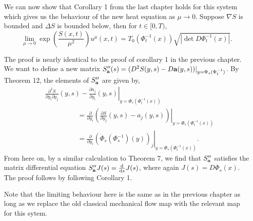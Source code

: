 \documentclass[a4paper,12pt,draft]{report}
\theoremstyle{remark}
\theoremstyle{definition}
\begin{document}
We can now show that Corollary 1 from the last chapter holds for this system which gives us the behaviour of the new heat equation as $\mu \to 0$.
\cor
{
Suppose $\nabla S$ is bounded and $\Delta S$ is bounded below, then for $t \in [0, T)$,
$$
\lim_{\mu \to 0}\exp\left(\frac{S(x, t)}{\mu^2}\right)u^\mu(x, t) = T_0(\Phi_t^{-1}(x))\sqrt{|\det D\Phi_t^{-1}(x)|}.
$$
}
\proof
{
The proof is nearly identical to the proof of corollary 1 in the previous chapter.  We want to define a new matrix $S_\bold{a}''(s) = (D^2S(y, s) - D\bold{a}(y, s))|_{y = \Phi_s(\Phi_t^{-1})}$.  By Theorem 12, the elements of $S_\bold{a}''$ are given by,
\begin{align}
& \left.\frac{\partial^2 S}{\partial y_i \partial y_j}(y, s) - \frac{\partial a_j}{\partial y_i}(y, s)\right|_{y = \Phi_s(\Phi_t^{-1}(x))}\nonumber\\
& \hspace{2cm} = \left.\frac{\partial}{\partial y_i}\left(\frac{\partial S}{\partial y_j}(y, s) - a_j(y, s)\right)\right|_{y = \Phi_s(\Phi_t^{-1}(x))}\nonumber\\
& \hspace{2cm} = \left.\frac{\partial}{\partial y_i}\left(\dot{\Phi}_s(\Phi_s^{-1})(y)\right)_j\right|_{y = \Phi_s(\Phi_t^{-1}(x))}.\nonumber
\end{align}
From here on, by a similar calculation to Theorem 7, we find that $S_\bold{a}''$ satisfies the matrix differential equation $S_\bold{a}''J(s) = \frac{\mathrm{d}}{\mathrm{d}s}J(s)$, where again $J(s) = D\Phi_s(x)$.  The proof follows by following Corollary 1.

\qedhere
}

Note that the limiting behaviour here is the same as in the previous chapter as long as we replace the old classical mechanical flow map with the relevant map for this sytem.
\end{document}
